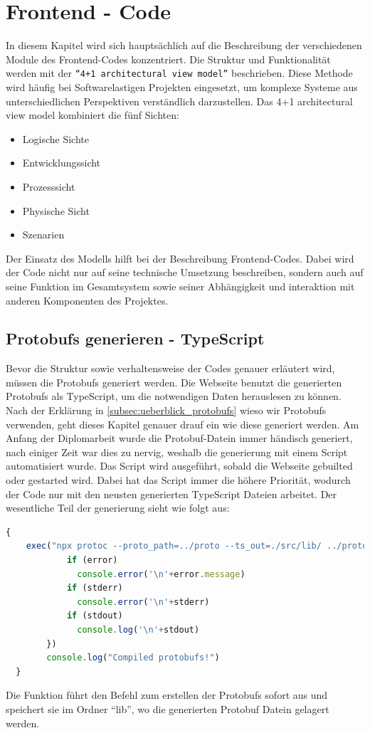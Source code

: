 \section{Frontend - Code}
\label{subsec:frontend_Code}
In diesem Kapitel wird sich hauptsächlich auf die Beschreibung der verschiedenen Module des
Frontend-Codes konzentriert. Die Struktur und Funktionalität werden mit der \texttt{``4+1 architectural view model''} beschrieben.
%
Diese Methode wird häufig bei Softwarelastigen Projekten eingesetzt, um komplexe Systeme aus unterschiedlichen
Perspektiven verständlich darzustellen.
Das 4+1 architectural view model kombiniert die fünf Sichten:
\begin{itemize}
  \item Logische Sichte
  \item Entwicklungssicht
  \item Prozesssicht
  \item Physische Sicht
  \item Szenarien
\end{itemize} 
Der Einsatz des Modells hilft bei der Beschreibung Frontend-Codes. 
Dabei wird der Code nicht nur auf seine technische Umsetzung beschreiben,
sondern auch auf seine Funktion im Gesamtsystem 
sowie seiner Abhängigkeit und interaktion mit anderen Komponenten des Projektes.

\subsection{Protobufs generieren - TypeScript}
\label{subsec:proto_gen_TS}
Bevor die Struktur sowie verhaltensweise der Codes genauer erläutert wird,
müssen die Protobufs generiert werden. 
%
Die Webseite benutzt die generierten Protobufs als TypeScript, 
um die notwendigen Daten herauslesen zu können.
%
Nach der Erklärung in \ref{subsec:ueberblick_protobufs} wieso wir Protobufs verwenden,
geht dieses Kapitel genauer drauf ein wie diese generiert werden.
%
Am Anfang der Diplomarbeit wurde die Protobuf-Datein immer händisch generiert, 
nach einiger Zeit war dies zu nervig, weshalb die generierung mit einem Script automatisiert wurde.
%
Das Script wird ausgeführt, sobald die Webseite gebuilted oder gestarted wird.
Dabei hat das Script immer die höhere Priorität, wodurch der Code nur mit den neusten generierten 
TypeScript Dateien arbeitet.
%
Der wesentliche Teil der generierung sieht wie folgt aus:
\begin{lstlisting}[language=JavaScript, gobble=4]
  {
    exec("npx protoc --proto_path=../proto --ts_out=./src/lib/ ../proto/*.proto", (error, stdout, stderr) => {
            if (error)
              console.error('\n'+error.message)
            if (stderr)
              console.error('\n'+stderr)
            if (stdout)
              console.log('\n'+stdout)
        })
        console.log("Compiled protobufs!")
  }
\end{lstlisting}
Die Funktion führt den Befehl zum erstellen der Protobufs sofort aus und speichert sie im Ordner ``lib'',
wo die generierten Protobuf Datein gelagert werden.

